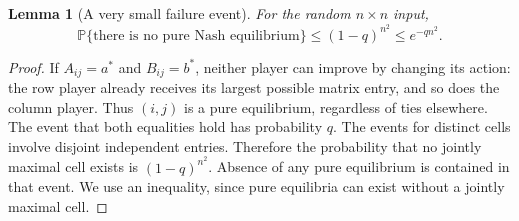 \documentclass[11pt,a4paper]{article}
\newtheorem{lemma}[theorem]{Lemma}
\newcommand{\Prb}{\mathbb P}
\begin{document}
\begin{lemma}[A very small failure event]
For the random $n\times n$ input,
\[
 \Prb\{\text{there is no pure Nash equilibrium}\}
 \leq(1-q)^{n^2}\leq e^{-qn^2}.
\]
\end{lemma}
\begin{proof}
If $A_{ij}=a^*$ and $B_{ij}=b^*$, neither player can improve by changing its action: the row player already receives its largest possible matrix entry, and so does the column player. Thus $(i,j)$ is a pure equilibrium, regardless of ties elsewhere. The event that both equalities hold has probability $q$. The events for distinct cells involve disjoint independent entries. Therefore the probability that no jointly maximal cell exists is $(1-q)^{n^2}$. Absence of any pure equilibrium is contained in that event. We use an inequality, since pure equilibria can exist without a jointly maximal cell.
\end{proof}
\end{document}
